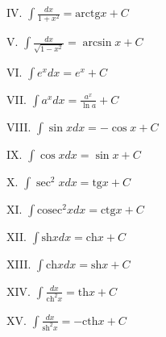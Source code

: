 IV.  $\int \frac{dx}{1+x^{2}}=\textrm{arctg}x+C$

V. $\int \frac{dx}{\sqrt{1-x^{2}}}=\arcsin{x}+C$

VI. $\int e^{x}dx=e^{x}+C$

VII. $\int a^{x}dx=\frac{a^{x}}{\ln{a}}+C$

VIII. $\int \sin{x}dx=-\cos{x}+C$	

IX. $\int \cos{x}dx=\sin{x}+C$

X. $\int \sec^{2}xdx=\textrm{tg}x+C$

XI. $\int \textrm{cosec}^{2}xdx=\textrm{ctg}x+C$

XII. $\int \textrm{sh}xdx=\textrm{ch}x+C$

XIII. $\int \textrm{ch}xdx=\textrm{sh}x+C$

XIV. $\int\frac{dx}{\textrm{ch}^{2}x}=\textrm{th}x+C$

XV. $\int \frac{dx}{\textrm{sh}^{2}x}=-\textrm{cth}x+C$

